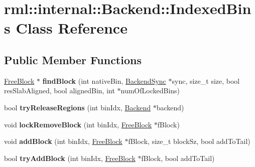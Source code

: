 \hypertarget{classrml_1_1internal_1_1Backend_1_1IndexedBins}{}\section{rml\+:\+:internal\+:\+:Backend\+:\+:Indexed\+Bins Class Reference}
\label{classrml_1_1internal_1_1Backend_1_1IndexedBins}
\subsection*{Public Member Functions}
\begin{DoxyCompactItemize}
\item 
\hypertarget{classrml_1_1internal_1_1Backend_1_1IndexedBins_a4684f88b1c25d15a9380433a4614f5e0}{}\hyperlink{classrml_1_1internal_1_1FreeBlock}{Free\+Block} $\ast$ {\bfseries find\+Block} (int native\+Bin, \hyperlink{classrml_1_1internal_1_1BackendSync}{Backend\+Sync} $\ast$sync, size\+\_\+t size, bool res\+Slab\+Aligned, bool aligned\+Bin, int $\ast$num\+Of\+Locked\+Bins)\label{classrml_1_1internal_1_1Backend_1_1IndexedBins_a4684f88b1c25d15a9380433a4614f5e0}

\item 
\hypertarget{classrml_1_1internal_1_1Backend_1_1IndexedBins_a5bae17c3790d4d8d24d071d5299825ad}{}bool {\bfseries try\+Release\+Regions} (int bin\+Idx, \hyperlink{classrml_1_1internal_1_1Backend}{Backend} $\ast$backend)\label{classrml_1_1internal_1_1Backend_1_1IndexedBins_a5bae17c3790d4d8d24d071d5299825ad}

\item 
\hypertarget{classrml_1_1internal_1_1Backend_1_1IndexedBins_afe6c07b5c2a5e3993f8e981aa9360cf4}{}void {\bfseries lock\+Remove\+Block} (int bin\+Idx, \hyperlink{classrml_1_1internal_1_1FreeBlock}{Free\+Block} $\ast$f\+Block)\label{classrml_1_1internal_1_1Backend_1_1IndexedBins_afe6c07b5c2a5e3993f8e981aa9360cf4}

\item 
\hypertarget{classrml_1_1internal_1_1Backend_1_1IndexedBins_affeac38642c3432ef621c6017968793a}{}void {\bfseries add\+Block} (int bin\+Idx, \hyperlink{classrml_1_1internal_1_1FreeBlock}{Free\+Block} $\ast$f\+Block, size\+\_\+t block\+Sz, bool add\+To\+Tail)\label{classrml_1_1internal_1_1Backend_1_1IndexedBins_affeac38642c3432ef621c6017968793a}

\item 
\hypertarget{classrml_1_1internal_1_1Backend_1_1IndexedBins_a1ebada812f000062847facfb2db46b11}{}bool {\bfseries try\+Add\+Block} (int bin\+Idx, \hyperlink{classrml_1_1internal_1_1FreeBlock}{Free\+Block} $\ast$f\+Block, bool add\+To\+Tail)\label{classrml_1_1internal_1_1Backend_1_1IndexedBins_a1ebada812f000062847facfb2db46b11}


\end{DoxyCompactItemize}

